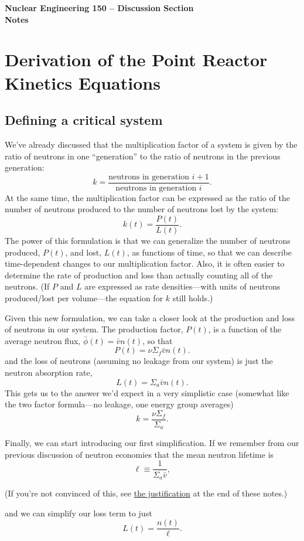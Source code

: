 \documentclass{report}
\begin{document}
\begin{center}
\textbf{\large Nuclear Engineering 150 -- Discussion Section}\\ 
\textbf{Notes}
\end{center}




\section*{Derivation of the Point Reactor Kinetics Equations} 

\subsection*{Defining a critical system}
We've already discussed that the multiplication factor of a system is given by the ratio of neutrons in one ``generation'' to the ratio of neutrons in the previous generation:
$$ k = \frac{\text{neutrons in generation }i + 1}{\text{neutrons in generation }i}.$$
At the same time, the multiplication factor can be expressed as the ratio of the number of neutrons produced to the number of neutrons lost by the system:
$$ k(t) = \frac{P(t)}{L(t)}.$$
The power of this formulation is that we can generalize the number of neutrons produced, $P(t)$, and lost, $L(t)$, as functions of time, so that we can describe time-dependent changes to our multiplication factor. Also, it is often easier to determine the rate of production and loss than actually counting all of the neutrons. (If $P$ and $L$ are expressed as rate densities---with units of neutrons produced/lost per volume---the equation for $k$ still holds.)

Given this new formulation, we can take a closer look at the production and loss of neutrons in our system. The production factor, $P(t)$, is a function of the average neutron flux, $\bar{\phi}(t) = \bar{v}n(t)$, so that 
$$ P(t) = \nu \Sigma_f \bar{v} n(t) .$$
and the loss of neutrons (assuming no leakage from our system) is just the neutron absorption rate, 
$$L(t) = \Sigma_a \bar{v}n(t) .$$
This gets us to the answer we'd expect in a very simplistic case (somewhat like the two factor formula---no leakage, one energy group averages)
$$ k = \frac{\nu \Sigma_f}{\Sigma_a} .$$

Finally, we can start introducing our first simplification. If we remember from our previous discussion of neutron economies that the mean neutron lifetime is 
$$ \ell \equiv \frac{1}{\Sigma_a \bar{v}}, $$
\begin{center}(If you're not convinced of this, see \hyperref[meanlifetime]{the justification} at the end of these notes.)\end{center}
and we can simplify our loss term to just 
$$L(t) = \frac{n(t)}{\ell} .$$
\end{document}
